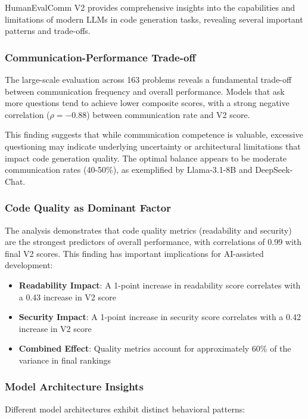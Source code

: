 \documentclass[conference]{IEEEtran}
\begin{document}
HumanEvalComm V2 provides comprehensive insights into the capabilities and limitations of modern LLMs in code generation tasks, revealing several important patterns and trade-offs.

\subsubsection{Communication-Performance Trade-off}

The large-scale evaluation across 163 problems reveals a fundamental trade-off between communication frequency and overall performance. Models that ask more questions tend to achieve lower composite scores, with a strong negative correlation ($\rho = -0.88$) between communication rate and V2 score.

This finding suggests that while communication competence is valuable, excessive questioning may indicate underlying uncertainty or architectural limitations that impact code generation quality. The optimal balance appears to be moderate communication rates (40-50\%), as exemplified by Llama-3.1-8B and DeepSeek-Chat.

\subsubsection{Code Quality as Dominant Factor}

The analysis demonstrates that code quality metrics (readability and security) are the strongest predictors of overall performance, with correlations of 0.99 with final V2 scores. This finding has important implications for AI-assisted development:

\begin{itemize}
    \item \textbf{Readability Impact}: A 1-point increase in readability score correlates with a 0.43 increase in V2 score
    \item \textbf{Security Impact}: A 1-point increase in security score correlates with a 0.42 increase in V2 score
    \item \textbf{Combined Effect}: Quality metrics account for approximately 60\% of the variance in final rankings
\end{itemize}

\subsubsection{Model Architecture Insights}

Different model architectures exhibit distinct behavioral patterns:
\end{document}
